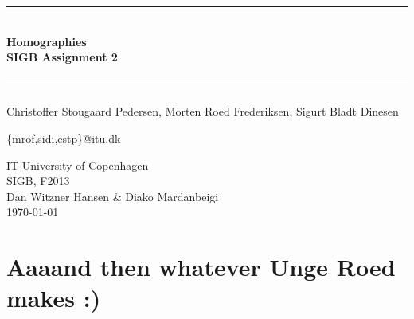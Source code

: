 \documentclass[]{article}
\begin{document}
\begin{titlepage}
\centering \parindent=0pt
\newcommand{\HRule}{\rule{\textwidth}{1mm}}
 \HRule\\[1cm]\Huge\bfseries
Homographies\\[0.7cm]
\large SIGB Assignment 2\\[1cm]
\HRule\\[4cm]  
Christoffer Stougaard Pedersen, Morten Roed Frederiksen, Sigurt
Bladt Dinesen


\small \{mrof,sidi,cstp\}{@}itu.dk
 \normalsize %
\begin{flushleft}
IT-University of Copenhagen \\
SIGB, F2013\\
Dan Witzner Hansen \& Diako Mardanbeigi \\
\today \end{flushleft}
\end{titlepage}

\tableofcontents
\pagebreak

\pagebreak









\section{Aaaand then whatever Unge Roed makes :)}
\end{document}
